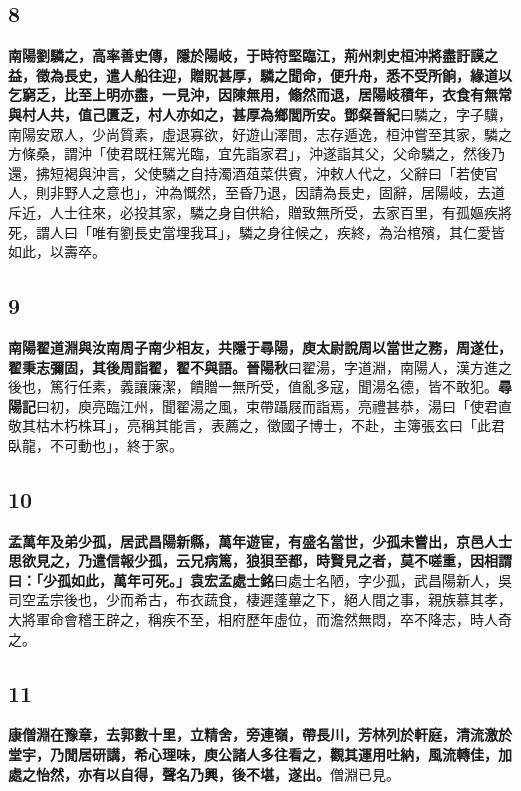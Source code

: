 \subsection*{8}

\textbf{南陽劉驎之，高率善史傳，隱於陽岐，于時符堅臨江，荊州刺史桓沖將盡訏謨之益，徵為長史，遣人船往迎，贈貺甚厚，驎之聞命，便升舟，悉不受所餉，緣道以乞窮乏，比至上明亦盡，一見沖，因陳無用，翛然而退，居陽岐積年，衣食有無常與村人共，值己匱乏，村人亦如之，甚厚為鄉閭所安。}{\footnotesize \textbf{鄧粲晉紀}曰驎之，字子驥，南陽安眾人，少尚質素，虛退寡欲，好遊山澤間，志存遁逸，桓沖嘗至其家，驎之方條桑，謂沖「使君既枉駕光臨，宜先詣家君」，沖遂詣其父，父命驎之，然後乃還，拂短褐與沖言，父使驎之自持濁酒葅菜供賓，沖敕人代之，父辭曰「若使官人，則非野人之意也」，沖為慨然，至昏乃退，因請為長史，固辭，居陽岐，去道斥近，人士往來，必投其家，驎之身自供給，贈致無所受，去家百里，有孤嫗疾將死，謂人曰「唯有劉長史當埋我耳」，驎之身往候之，疾終，為治棺殯，其仁愛皆如此，以壽卒。}

\subsection*{9}

\textbf{南陽翟道淵與汝南周子南少相友，共隱于尋陽，庾太尉說周以當世之務，周遂仕，翟秉志彌固，其後周詣翟，翟不與語。}{\footnotesize \textbf{晉陽秋}曰翟湯，字道淵，南陽人，漢方進之後也，篤行任素，義讓廉潔，饋贈一無所受，值亂多寇，聞湯名德，皆不敢犯。\textbf{尋陽記}曰初，庾亮臨江州，聞翟湯之風，束帶躡屐而詣焉，亮禮甚恭，湯曰「使君直敬其枯木朽株耳」，亮稱其能言，表薦之，徵國子博士，不赴，主簿張玄曰「此君臥龍，不可動也」，終于家。}

\subsection*{10}

\textbf{孟萬年及弟少孤，居武昌陽新縣，萬年遊宦，有盛名當世，少孤未嘗出，京邑人士思欲見之，乃遣信報少孤，云兄病篤，狼狽至都，時賢見之者，莫不嗟重，因相謂曰：「少孤如此，萬年可死。」}{\footnotesize \textbf{袁宏孟處士銘}曰處士名陋，字少孤，武昌陽新人，吳司空孟宗後也，少而希古，布衣蔬食，棲遲蓬蓽之下，絕人間之事，親族慕其孝，大將軍命會稽王辟之，稱疾不至，相府歷年虛位，而澹然無悶，卒不降志，時人奇之。}

\subsection*{11}

\textbf{康僧淵在豫章，去郭數十里，立精舍，旁連嶺，帶長川，芳林列於軒庭，清流激於堂宇，乃閒居研講，希心理味，庾公諸人多往看之，觀其運用吐納，風流轉佳，加處之怡然，亦有以自得，聲名乃興，後不堪，遂出。}{\footnotesize 僧淵已見。}

